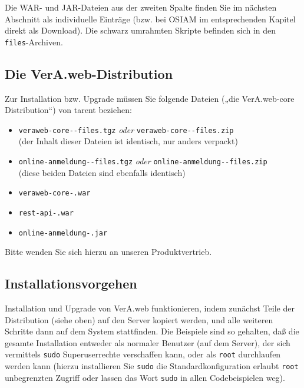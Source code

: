 Die WAR- und JAR-Dateien aus der zweiten Spalte finden Sie im
nächsten Abschnitt als individuelle Einträge (bzw. bei OSIAM
im entsprechenden Kapitel direkt als Download). Die schwarz
umrahmten Skripte befinden sich in den \texttt{files}-Archiven.

\fi%

\subsection{Die VerA.web-Distribution}\label{subsec:intro-distro}

Zur Installation bzw. Upgrade müssen Sie folgende Dateien („die
VerA.web-core Distribution“) von tarent beziehen:\keinumbruch

\begin{itemize}
 \item{\texttt{veraweb-core-\vwiaverssw{}-files.tgz}
  \emph{oder} \texttt{veraweb-core-\vwiaverssw{}-files.zip}
  \\(der Inhalt dieser Dateien ist identisch, nur anders verpackt)}
\ifoa
 \item{\texttt{online-anmeldung-\vwiaverssw{}-files.tgz}
  \emph{oder} \texttt{online-anmeldung-\vwiaverssw{}-files.zip}
  \\(diese beiden Dateien sind ebenfalls identisch)}
\fi%
 \item{\texttt{veraweb-core-\vwiaverssw{}.war}}
 \item{\texttt{rest-api-\vwiaverssw{}.war}}
\ifoa
 \item{\texttt{online-anmeldung-\vwiaverssw{}.jar}}
\fi%
\end{itemize}

Bitte wenden Sie sich hierzu an unseren Produktvertrieb.

\subsection{Installationsvorgehen}\label{subsec:intro-install}

Installation und Upgrade von VerA.web funktionieren, indem
zunächst Teile der Distribution (siehe oben) auf den Server
kopiert werden, und alle weiteren Schritte dann auf dem System
stattfinden. Die Beispiele sind so gehalten, daß die gesamte
Installation entweder als normaler Benutzer (auf dem Server),
der sich vermittels \texttt{sudo} Superuserrechte verschaffen
kann, oder als \texttt{root} durchlaufen werden kann (hierzu
installieren Sie \texttt{sudo} \dash die Standardkonfiguration
erlaubt \texttt{root} unbegrenzten Zugriff \dash oder lassen
das Wort \texttt{sudo} in allen Codebeispielen weg).

